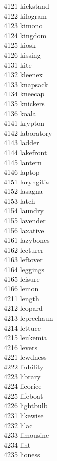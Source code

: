 4121 kickstand \\
4122 kilogram \\
4123 kimono \\
4124 kingdom \\
4125 kiosk \\
4126 kissing \\
4131 kite \\
4132 kleenex \\
4133 knapsack \\
4134 kneecap \\
4135 knickers \\
4136 koala \\
4141 krypton \\
4142 laboratory \\
4143 ladder \\
4144 lakefront \\
4145 lantern \\
4146 laptop \\
4151 laryngitis \\
4152 lasagna \\
4153 latch \\
4154 laundry \\
4155 lavender \\
4156 laxative \\
4161 lazybones \\
4162 lecturer \\
4163 leftover \\
4164 leggings \\
4165 leisure \\
4166 lemon \\
4211 length \\
4212 leopard \\
4213 leprechaun \\
4214 lettuce \\
4215 leukemia \\
4216 levers \\
4221 lewdness \\
4222 liability \\
4223 library \\
4224 licorice \\
4225 lifeboat \\
4226 lightbulb \\
4231 likewise \\
4232 lilac \\
4233 limousine \\
4234 lint \\
4235 lioness \\
